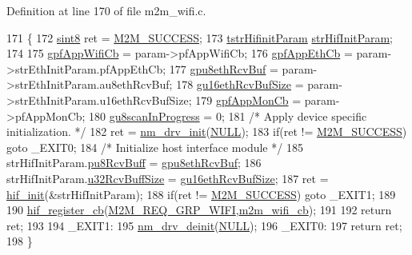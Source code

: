 Definition at line 170 of file m2m\+\_\+wifi.\+c.


\begin{DoxyCode}
171 \{
172     \hyperlink{group__DataT_gae35f10ffd0ac8dd2bc3e794da9bdfbc7}{sint8} ret = \hyperlink{nm__common_8h_a9ef27ba27aafdd1aa3a79d3ba2c36b8f}{M2M\_SUCCESS};
173     \hyperlink{structtstrHifinitParam}{tstrHifinitParam} \hyperlink{m2m__hif_8c_a6ae7b8f5c97ebf1c5775d9272af3f9e7}{strHifInitParam};
174 
175     \hyperlink{m2m__wifi_8c_ad0c49a5f45987a529a0c5eaceacac550}{gpfAppWifiCb}        = param->pfAppWifiCb;
176     \hyperlink{m2m__wifi_8c_a767ada1c5f8e15f227a2b4113c274cbb}{gpfAppEthCb}          = param->strEthInitParam.pfAppEthCb;
177     \hyperlink{m2m__wifi_8c_ac9b0480acc01f285eeb79d93df9c83cb}{gpu8ethRcvBuf}       = param->strEthInitParam.au8ethRcvBuf;
178     \hyperlink{m2m__wifi_8c_a396c0ca6c68ad0a6a752cc4bb0c95b99}{gu16ethRcvBufSize}  = param->strEthInitParam.u16ethRcvBufSize;
179     \hyperlink{m2m__wifi_8c_aad3c1fca378ec753b43a86ebe6fac797}{gpfAppMonCb}  = param->pfAppMonCb;
180     \hyperlink{m2m__wifi_8c_a76295f775841fc0f6533603c99da618e}{gu8scanInProgress} = 0;
181     \textcolor{comment}{/* Apply device specific initialization. */}
182     ret = \hyperlink{nmdrv_8c_a5b11f44fa8edd600cccd32ece263e3eb}{nm\_drv\_init}(\hyperlink{group__BSPDefine_ga070d2ce7b6bb7e5c05602aa8c308d0c4}{NULL});
183     \textcolor{keywordflow}{if}(ret != \hyperlink{nm__common_8h_a9ef27ba27aafdd1aa3a79d3ba2c36b8f}{M2M\_SUCCESS})   \textcolor{keywordflow}{goto} \_EXIT0;
184     \textcolor{comment}{/* Initialize host interface module */}
185     strHifInitParam.\hyperlink{structtstrHifinitParam_a8fba7791bb370e1824b8a0d0365c71c5}{pu8RcvBuff} = \hyperlink{m2m__wifi_8c_ac9b0480acc01f285eeb79d93df9c83cb}{gpu8ethRcvBuf};
186     strHifInitParam.\hyperlink{structtstrHifinitParam_a0a0ef27c7b11c7e708fc4a4e694edec2}{u32RcvBuffSize} = \hyperlink{m2m__wifi_8c_a396c0ca6c68ad0a6a752cc4bb0c95b99}{gu16ethRcvBufSize};
187     ret = \hyperlink{m2m__hif_8c_af9f7692c301ce176fe370b42682badbd}{hif\_init}(&strHifInitParam);
188     \textcolor{keywordflow}{if}(ret != \hyperlink{nm__common_8h_a9ef27ba27aafdd1aa3a79d3ba2c36b8f}{M2M\_SUCCESS})   \textcolor{keywordflow}{goto} \_EXIT1;
189 
190     \hyperlink{m2m__hif_8c_a63f14be680fcf28f96912ee6e6f28be9}{hif\_register\_cb}(\hyperlink{nm__common_8h_a9ab02eb1aea02a75c3f5aade4eef1276aeb9a7d57324ba4b8a6c2a5f46dd499c2}{M2M\_REQ\_GRP\_WIFI},\hyperlink{m2m__wifi_8c_a973be137398735026a70b21a59e11900}{m2m\_wifi\_cb});
191 
192     \textcolor{keywordflow}{return} ret;
193 
194 \_EXIT1:
195     \hyperlink{nmdrv_8c_a444c8058e44c2381fcceac93a5f53a3c}{nm\_drv\_deinit}(\hyperlink{group__BSPDefine_ga070d2ce7b6bb7e5c05602aa8c308d0c4}{NULL});
196 \_EXIT0:
197     \textcolor{keywordflow}{return} ret;
198 \}
\end{DoxyCode}
